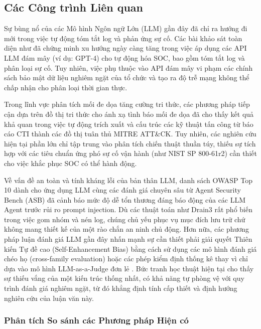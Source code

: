 \documentclass[12pt,a4paper]{article}
\begin{document}
\subsection{Các Công trình Liên quan}
Sự bùng nổ của các Mô hình Ngôn ngữ Lớn (LLM) gần đây đã chỉ ra hướng đi mới trong việc tự động tóm tắt log và phản ứng sự cố. Các bài khảo sát toàn diện như \cite{habibzadeh2025} đã chứng minh xu hướng ngày càng tăng trong việc áp dụng các API LLM đám mây (ví dụ: GPT-4) cho tự động hóa SOC, bao gồm tóm tắt log và phân loại sự cố. Tuy nhiên, việc phụ thuộc vào API đám mây vi phạm các chính sách bảo mật dữ liệu nghiêm ngặt của tổ chức và tạo ra độ trễ mạng không thể chấp nhận cho phân loại thời gian thực.

Trong lĩnh vực phân tích mối đe dọa tăng cường tri thức, các phương pháp tiếp cận dựa trên đồ thị tri thức cho ánh xạ tình báo mối đe dọa \cite{attackg2023} đã cho thấy kết quả khả quan trong việc tự động trích xuất và cấu trúc các kỹ thuật tấn công từ báo cáo CTI thành các đồ thị tuân thủ MITRE ATT\&CK. Tuy nhiên, các nghiên cứu hiện tại phần lớn chỉ tập trung vào phân tích chiến thuật thuần túy, thiếu sự tích hợp với các tiêu chuẩn ứng phó sự cố vận hành (như NIST SP 800-61r2) cần thiết cho việc khắc phục SOC có thể hành động.

Về vấn đề an toàn và tính kháng lỗi của bản thân LLM, danh sách OWASP Top 10 dành cho ứng dụng LLM \cite{owasp2025} cùng các đánh giá chuyên sâu từ Agent Security Bench (ASB) \cite{zhang2024asb} đã cảnh báo mức độ dễ tổn thương đáng báo động của các LLM Agent trước rủi ro prompt injection. Dù các thuật toán như Drain3 \cite{he2017} rất phổ biến trong việc gom nhóm và nén log, chúng chủ yếu phục vụ mục đích lưu trữ chứ không mang thiết kế của một rào chắn an ninh chủ động. Hơn nữa, các phương pháp luận đánh giá LLM gần đây nhấn mạnh sự cần thiết phải giải quyết Thiên kiến Tự đề cao (Self-Enhancement Bias) bằng cách sử dụng các mô hình đánh giá chéo họ (cross-family evaluation) hoặc các phép kiểm định thống kê thay vì chỉ dựa vào mô hình LLM-as-a-Judge đơn lẻ \cite{zheng2023, ragas2023}. Bức tranh học thuật hiện tại cho thấy sự thiếu vắng của một kiến trúc thống nhất, có khả năng tự phòng vệ với quy trình đánh giá nghiêm ngặt, từ đó khẳng định tính cấp thiết và định hướng nghiên cứu của luận văn này.

\subsubsection{Phân tích So sánh các Phương pháp Hiện có}
\end{document}
